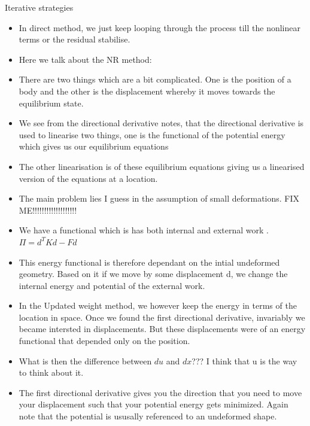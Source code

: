 	\begin{frame}{Iterative strategies}
		\begin{itemize}
			\item In direct method, we just keep looping through the process till the nonlinear terms or the residual stabilise.
			\item Here we talk about the NR method:
			\item There are two things which are a bit complicated. One is the position of a body and the other is the displacement whereby it moves towards the equilibrium state.
			\item We see from the directional derivative notes, that the directional derivative is used to linearise two things, one is the functional of the potential energy which gives us our equilibrium equations
			\item The other linearisation is of these equilibrium equations giving us a linearised version of the equations at a location.		
		\end{itemize}

	\end{frame}


	\begin{frame}
		\begin{itemize}
			\item The main problem lies I guess in the assumption of small deformations. FIX ME!!!!!!!!!!!!!!!!!!!
			\item We have a functional which is has both internal and external work . $\Pi = d^TKd - Fd$
			\item This energy functional is therefore dependant on the intial undeformed geometry. Based on it if we move by some displacement d, we change the internal energy and potential of the external work.
			\item In the Updated weight method, we however keep the energy in terms of the location in space. Once we found the first directional derivative, invariably we became intersted in displacements. But these displacements were of an energy functional that depended only on the position. 
			\item What is then the difference between $du$ and $dx$??? I think that u is the way to think about it.
			\item The first directional derivative gives you the direction that you need to move your displacement such that your potential energy gets minimized. Again note that the potential is ususally referenced to an undeformed shape. 
		\end{itemize}
	\end{frame}

